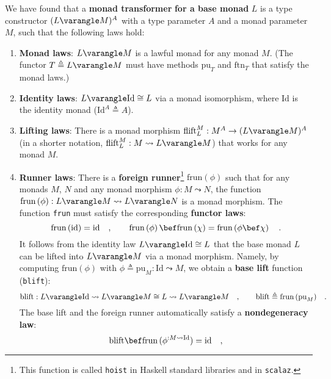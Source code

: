 We have found that a \textbf{monad transformer}
\textbf{for a base monad} $L$ is a type constructor $(L\varangle M)^{A}$
with a type parameter $A$ and a monad parameter $M$, such that the
following laws hold:
\begin{enumerate}
\item \textbf{Monad laws}: $L\varangle M$ is a lawful monad for any monad
$M$. (The functor $T\triangleq L\varangle M$
must have methods $\text{pu}_{T}$ and $\text{ftn}_{T}$ that satisfy
the monad laws.)
\item \textbf{Identity laws}: $L\varangle\text{Id}\cong L$
via a monad isomorphism, where $\text{Id}$ is the identity monad
($\text{Id}^{A}\triangleq A$).
\item \textbf{Lifting laws}: There
is a monad morphism $\text{flift}_{L}^{M}:M^{A}\rightarrow(L\varangle M)^{A}$
(in a shorter notation, $\text{flift}_{L}^{M}:M\leadsto L\varangle M$)
that works for any monad $M$.
\item \textbf{Runner laws}: There
is a \textbf{foreign runner}\footnote{This function is called \lstinline!hoist! in Haskell standard libraries
and in \texttt{scalaz}.} $\text{frun}\left(\phi\right)$ such that for any monads $M$, $N$
and any monad morphism $\phi:M\leadsto N$, the function $\text{frun}\left(\phi\right):L\varangle M\leadsto L\varangle N$
is a monad morphism. The function \lstinline!frun! must satisfy the
corresponding \textbf{functor laws}:
\[
\text{frun}\left(\text{id}\right)=\text{id}\quad,\quad\quad\text{frun}\left(\phi\right)\bef\text{frun}\left(\chi\right)=\text{frun}\left(\phi\bef\chi\right)\quad.
\]
It follows from the identity law $L\varangle\text{Id}\cong L$ that
the base monad $L$ can be lifted into $L\varangle M$ via a monad
morphism. Namely, by computing $\text{frun}\left(\phi\right)$ with
$\phi\triangleq\text{pu}_{M}:\text{Id}\leadsto M$, we obtain a \textbf{base
lift} function (\lstinline!blift!):
\[
\text{blift}:L\varangle\text{Id}\leadsto L\varangle M\cong L\leadsto L\varangle M\quad,\quad\quad\text{blift}\triangleq\text{frun}\,(\text{pu}_{M})\quad.
\]
The base lift and the foreign runner automatically satisfy a \textbf{nondegeneracy
law}:
\[
\text{blift}\bef\text{frun}\,(\phi^{:M\leadsto\text{Id}})=\text{id}\quad,
\]
\end{enumerate}
